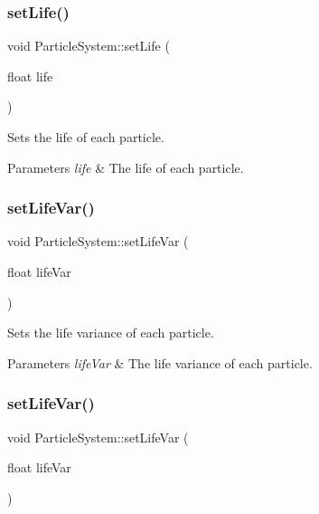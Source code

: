 \subsubsection{\texorpdfstring{set\+Life()}{setLife()}\hspace{0.1cm}{\footnotesize\ttfamily [2/2]}}
{\footnotesize\ttfamily void Particle\+System\+::set\+Life (\begin{DoxyParamCaption}\item[{float}]{life }\end{DoxyParamCaption})\hspace{0.3cm}{\ttfamily [inline]}}

Sets the life of each particle.


\begin{DoxyParams}{Parameters}
{\em life} & The life of each particle. \\
\hline
\end{DoxyParams}
\mbox{\label{classParticleSystem_a3c33373f28ce8a61fef7526d33ca052d}} 
\subsubsection{\texorpdfstring{set\+Life\+Var()}{setLifeVar()}\hspace{0.1cm}{\footnotesize\ttfamily [1/2]}}
{\footnotesize\ttfamily void Particle\+System\+::set\+Life\+Var (\begin{DoxyParamCaption}\item[{float}]{life\+Var }\end{DoxyParamCaption})\hspace{0.3cm}{\ttfamily [inline]}}

Sets the life variance of each particle.


\begin{DoxyParams}{Parameters}
{\em life\+Var} & The life variance of each particle. \\
\hline
\end{DoxyParams}
\mbox{\label{classParticleSystem_a3c33373f28ce8a61fef7526d33ca052d}} 
\subsubsection{\texorpdfstring{set\+Life\+Var()}{setLifeVar()}\hspace{0.1cm}{\footnotesize\ttfamily [2/2]}}
{\footnotesize\ttfamily void Particle\+System\+::set\+Life\+Var (\begin{DoxyParamCaption}\item[{float}]{life\+Var }\end{DoxyParamCaption})\hspace{0.3cm}{\ttfamily [inline]}}

